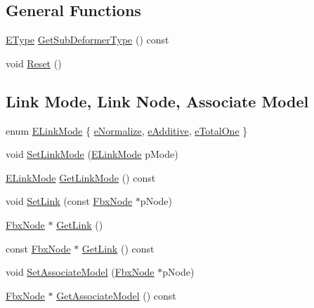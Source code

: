 \subsection*{General Functions}
\begin{DoxyCompactItemize}
\item 
\hyperlink{class_fbx_sub_deformer_aed7eba8aabbb8b25a8ddbab127d67319}{E\+Type} \hyperlink{class_fbx_cluster_aa395931c54c7a8b7e23b1be50b32a1d6}{Get\+Sub\+Deformer\+Type} () const
\item 
void \hyperlink{class_fbx_cluster_a6e12a1e6e2d6d8a05ddee9f280827cfc}{Reset} ()
\end{DoxyCompactItemize}
\subsection*{Link Mode, Link Node, Associate Model}
\begin{DoxyCompactItemize}
\item 
enum \hyperlink{class_fbx_cluster_aaa2afaedfd33eda65c46bb5a3d04dab0}{E\+Link\+Mode} \{ \hyperlink{class_fbx_cluster_aaa2afaedfd33eda65c46bb5a3d04dab0a2b160c0bc6bd02bbf77ad6c1c4dd3a92}{e\+Normalize}, 
\hyperlink{class_fbx_cluster_aaa2afaedfd33eda65c46bb5a3d04dab0a12e30c3eec544ecd47f024317dd575af}{e\+Additive}, 
\hyperlink{class_fbx_cluster_aaa2afaedfd33eda65c46bb5a3d04dab0a3176978fbb1e2df16c076c35d304abd7}{e\+Total\+One}
 \}
\item 
void \hyperlink{class_fbx_cluster_a13e98718c3604a08b7ac4c29ce763b2f}{Set\+Link\+Mode} (\hyperlink{class_fbx_cluster_aaa2afaedfd33eda65c46bb5a3d04dab0}{E\+Link\+Mode} p\+Mode)
\item 
\hyperlink{class_fbx_cluster_aaa2afaedfd33eda65c46bb5a3d04dab0}{E\+Link\+Mode} \hyperlink{class_fbx_cluster_a518c2eab52051a783b2b0137dde14ff7}{Get\+Link\+Mode} () const
\item 
void \hyperlink{class_fbx_cluster_ac47ba1185bc9bb341636dbaf43f209ff}{Set\+Link} (const \hyperlink{class_fbx_node}{Fbx\+Node} $\ast$p\+Node)
\item 
\hyperlink{class_fbx_node}{Fbx\+Node} $\ast$ \hyperlink{class_fbx_cluster_a4fa45a143cf4e47f9869ae7ca561ac2a}{Get\+Link} ()
\item 
const \hyperlink{class_fbx_node}{Fbx\+Node} $\ast$ \hyperlink{class_fbx_cluster_a72cb9d141005de3f3236681686983893}{Get\+Link} () const
\item 
void \hyperlink{class_fbx_cluster_a561e81f78f469d7579879f0f27c9c6de}{Set\+Associate\+Model} (\hyperlink{class_fbx_node}{Fbx\+Node} $\ast$p\+Node)
\item 
\hyperlink{class_fbx_node}{Fbx\+Node} $\ast$ \hyperlink{class_fbx_cluster_a08f922ec0002197f4f8657d84af1d7fc}{Get\+Associate\+Model} () const
\end{DoxyCompactItemize}
